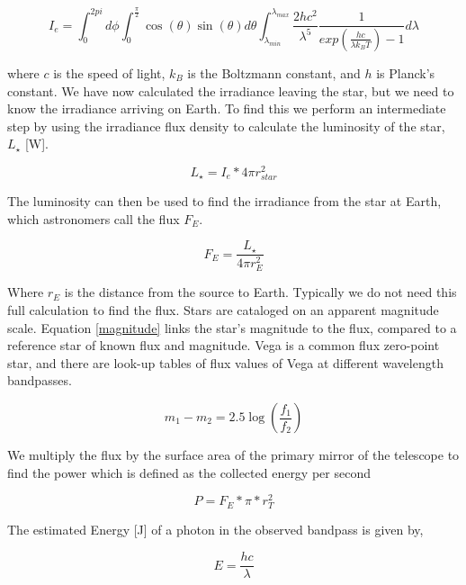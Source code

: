 \begin{equation}
    I_e=\int_{0}^{2pi} d\phi \int_{0}^{\frac{\pi}{2}} \cos(\theta)\sin(\theta)d\theta \int_{\lambda_{min}}^{\lambda_{max}} \frac{2hc^2}{\lambda^5}\frac{1}{exp(\frac{hc}{\lambda k_B T})-1} d\lambda
\end{equation}

where $c$ is the speed of light, $k_B$ is the Boltzmann constant, and $h$ is Planck's constant. We have now calculated the irradiance leaving the star, but we need to know the irradiance arriving on Earth. To find this we perform an intermediate step by using the irradiance flux density to calculate the luminosity of the star, $L_{\star}$ [W].

\begin{equation}
    L_{\star}=I_e*4\pi r_{star}^2
\end{equation}

The luminosity can then be used to find the irradiance from the star at Earth, which astronomers call the flux $F_{E}$.

\begin{equation}
    F_{E}=\frac{L_{\star}}{4\pi r_{E}^2}
\end{equation}

Where $r_{E}$ is the distance from the source to Earth. Typically we do not need this full calculation to find the flux. Stars are cataloged on an apparent magnitude scale. Equation \ref{magnitude} links the star's magnitude to the flux, compared to a reference star of known flux and magnitude. Vega is a common flux zero-point star, and there are look-up tables of flux values of Vega at different wavelength bandpasses. 

\begin{equation}
    m_1-m_2=
    2.5 \log\left(
        \frac{f_1}{f_2}
    \right)
    \label{magnitude}
\end{equation}

 We multiply the flux by the surface area of the primary mirror of the telescope to find the power which is defined as the collected energy per second

\begin{equation}
    P=F_{E}*\pi*r_T^2
\end{equation}

The estimated Energy [J] of a photon in the observed bandpass is given by,

\begin{equation}
    E=\frac{hc}{\lambda}
\end{equation}

